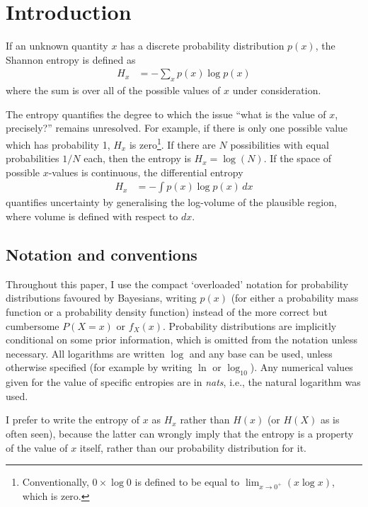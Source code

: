 \documentclass[entropy,article,accept,oneauthor,pdftex,10pt,a4paper]{mdpi}
\begin{document}

\section{Introduction}

If an unknown quantity $x$ has a discrete probability distribution $p(x)$,
the Shannon entropy \citep{shannon} is defined as
\begin{align}
H_{x} &= -\sum_{x} p(x) \log p(x)
\end{align}
where the sum is over all of the possible values of $x$ under consideration.

The entropy quantifies the degree to which the issue
``what is the value of $x$, precisely?'' remains unresolved. For example,
if there is only one possible value which has probability 1, $H_x$ is
zero\footnote{Conventionally, $0 \times \log 0$ is defined to be equal
to $\lim_{x \to 0^+} (x\log x)$, which is zero.}.
If there are $N$ possibilities with equal probabilities $1/N$ each,
then the entropy is $H_x = \log(N)$.
If the space of possible $x$-values is continuous, the differential
entropy
\begin{align}
H_{x} &= -\int p(x) \log p(x) \, dx
\end{align}
quantifies uncertainty by generalising the log-volume
of the plausible region, where volume is defined with respect to $dx$.

\subsection{Notation and conventions}

Throughout this paper, I use the compact
`overloaded' notation for probability distributions favoured by
Bayesians, writing $p(x)$ (for either a probability mass function
or a probability density function) instead
of the more correct but cumbersome $P(X=x)$ or $f_X(x)$.
Probability distributions are implicitly conditional on some prior
information, which is omitted from the notation unless necessary.
All logarithms are written $\log$ and any base can be used, unless otherwise
specified (for example by writing $\ln$ or $\log_{10}$). Any numerical
values given for the value of specific entropies are in {\em nats}, i.e.,
the natural logarithm was used.

I prefer to write the entropy of $x$ as $H_x$ rather than $H(x)$
(or $H(X)$ as is often seen), because the latter can wrongly imply that
the entropy is a property of the value of $x$ itself, rather than
our probability distribution for it.
\end{document}
